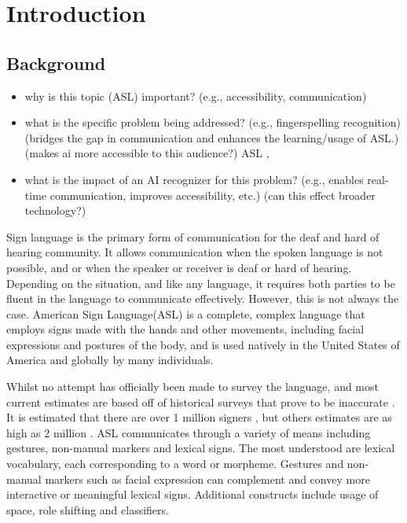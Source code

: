 \section{Introduction}
\subsection{Background}
\begin{itemize}
    \item why is this topic (ASL) important? (e.g., accessibility, communication)

    \item what is the specific problem being addressed? (e.g., fingerspelling recognition) (bridges the gap in communication and enhances the learning/usage of ASL.) (makes ai more accessible to this audience?)
          ASL ,
    \item what is the impact of an AI recognizer for this problem? (e.g., enables real-time communication, improves accessibility, etc.) (can this effect broader technology?)
\end{itemize}

Sign language is the primary form of communication for the deaf and hard of hearing community. It allows communication when the spoken language is not possible, and or when the speaker or receiver is deaf or hard of hearing.
Depending on the situation, and like any language, it requires both parties to be fluent in the language to communicate effectively. However, this is not always the case. American Sign Language(ASL) is a complete, complex language that employs signs made with the hands and other movements, including facial expressions and postures of the body, and is used natively in the
United States of America and globally by many individuals.

Whilst no attempt has officially been made to survey the language, and most current estimates are based off of historical surveys that prove to be inaccurate \citep{mitchellHowManyPeople2006}. It is estimated that there are over 1 million signers \citep{ethnologueAmericanSignLanguage2023}, but others estimates are as high as 2 million \citep{mitchellHowManyPeople2006}.
ASL communicates through a variety of means including gestures, non-manual markers and lexical signs. The most understood are lexical vocabulary, each corresponding to a word or morpheme. Gestures and non-manual markers such as facial expression can complement and convey more interactive or meaningful lexical signs. Additional constructs include usage of space, role shifting and classifiers.

